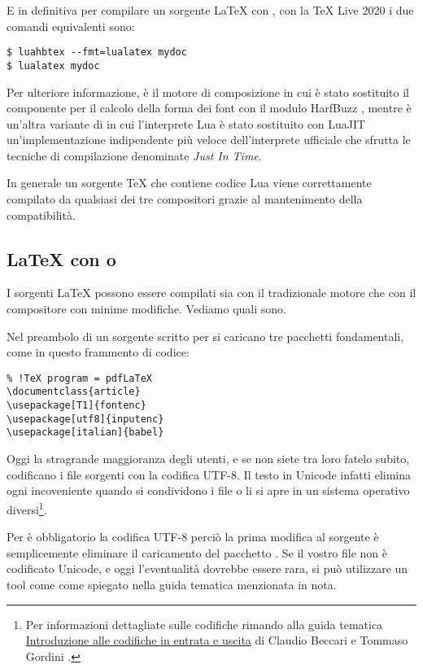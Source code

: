 E in definitiva per compilare un sorgente \LaTeX{} con \LuaLaTeX{}, con la TeX
Live 2020 i due comandi equivalenti sono:
\begin{Verbatim}[numbers=none]
$ luahbtex --fmt=lualatex mydoc
$ lualatex mydoc
\end{Verbatim}

Per ulteriore informazione,  è il motore di composizione
 in cui è stato sostituito il componente per il calcolo della forma
dei font con il modulo HarfBuzz \cite{lib:harfbuzz}, mentre  è
un'altra variante di  in cui l'interprete Lua è stato sostituito
con LuaJIT \cite{prg:luajit} un'implementazione indipendente più veloce
dell'interprete ufficiale che sfrutta le tecniche di compilazione denominate
\emph{Just In Time}.

In generale un sorgente \TeX{} che contiene codice Lua viene correttamente
compilato da qualsiasi dei tre compositori grazie al mantenimento della
compatibilità.


\subsection{\LaTeX{} con  o }

I sorgenti \LaTeX{} possono essere compilati sia con il tradizionale motore
 che con il compositore  con minime modifiche.
Vediamo quali sono.

Nel preambolo di un sorgente scritto per  si caricano tre
pacchetti fondamentali, come in questo frammento di codice:
\begin{Verbatim}
% !TeX program = pdfLaTeX
\documentclass{article}
\usepackage[T1]{fontenc}
\usepackage[utf8]{inputenc}
\usepackage[italian]{babel}
\end{Verbatim}

Oggi la stragrande maggioranza degli utenti, e se non siete tra loro fatelo
subito, codificano i file sorgenti con la codifica UTF-8. Il testo in Unicode
infatti elimina ogni incoveniente quando si condividono i file o li si apre in
un sistema operativo diversi\footnote{Per informazioni dettagliate sulle
codifiche rimando alla guida tematica \GuIT{}
\href{http://www.guitex.org/home/images/doc/GuideGuIT/introcodifiche.pdf}{%
Introduzione alle codifiche in entrata e uscita} di Claudio Beccari e Tommaso
Gordini \cite{gt:codifiche}.}.

Per \LuaTeX{} è obbligatorio la codifica UTF-8 perciò la prima modifica al
sorgente è semplicemente eliminare il caricamento del pacchetto .
Se il vostro file non è codificato Unicode, e oggi l'eventualità dovrebbe essere
rara, si può utilizzare un tool come  come spiegato nella guida
tematica menzionata in nota.

